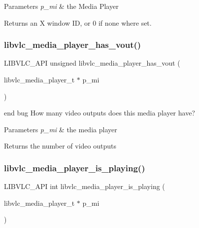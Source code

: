 \begin{DoxyParams}{Parameters}
{\em p\+\_\+mi} & the Media Player \\
\hline
\end{DoxyParams}
\begin{DoxyReturn}{Returns}
an X window ID, or 0 if none where set. 
\end{DoxyReturn}
\mbox{\label{group__libvlc__media__player_ga2458b35abe7063cdfe5e6ef87a3be3b6}} 
\subsubsection{\texorpdfstring{libvlc\+\_\+media\+\_\+player\+\_\+has\+\_\+vout()}{libvlc\_media\_player\_has\_vout()}}
{\footnotesize\ttfamily L\+I\+B\+V\+L\+C\+\_\+\+A\+PI unsigned libvlc\+\_\+media\+\_\+player\+\_\+has\+\_\+vout (\begin{DoxyParamCaption}\item[{libvlc\+\_\+media\+\_\+player\+\_\+t $\ast$}]{p\+\_\+mi }\end{DoxyParamCaption})}

end bug How many video outputs does this media player have?


\begin{DoxyParams}{Parameters}
{\em p\+\_\+mi} & the media player \\
\hline
\end{DoxyParams}
\begin{DoxyReturn}{Returns}
the number of video outputs 
\end{DoxyReturn}
\mbox{\label{group__libvlc__media__player_ga70fd26f9bbca7eda021a49680e7fbc1c}} 
\subsubsection{\texorpdfstring{libvlc\+\_\+media\+\_\+player\+\_\+is\+\_\+playing()}{libvlc\_media\_player\_is\_playing()}}
{\footnotesize\ttfamily L\+I\+B\+V\+L\+C\+\_\+\+A\+PI int libvlc\+\_\+media\+\_\+player\+\_\+is\+\_\+playing (\begin{DoxyParamCaption}\item[{libvlc\+\_\+media\+\_\+player\+\_\+t $\ast$}]{p\+\_\+mi }\end{DoxyParamCaption})}

